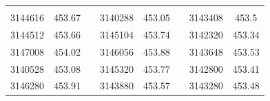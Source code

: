 \documentclass[12pt]{mwart}
\begin{document}

	\begin{table}[H]
	\centering
	\begin{tabular}{cclcclcc}
		\cellcolor[HTML]{4472C4}{\color[HTML]{FFFFFF} $t_c$ [$\mathrm{\mu s}$]} & \cellcolor[HTML]{4472C4}{\color[HTML]{FFFFFF} $C$ [$\mathrm{\mu F}$]} &  & \cellcolor[HTML]{4472C4}{\color[HTML]{FFFFFF} $t_c$ [$\mathrm{\mu s}$]} & \cellcolor[HTML]{4472C4}{\color[HTML]{FFFFFF} $C$ [$\mathrm{\mu F}$]} &  & \cellcolor[HTML]{4472C4}{\color[HTML]{FFFFFF} $t_c$ [$\mathrm{\mu s}$]} & \cellcolor[HTML]{4472C4}{\color[HTML]{FFFFFF} $C$ [$\mathrm{\mu F}$]} \\
		3144616                                                  & 453.67                                                        &  & 3140288                                                  & 453.05                                                        &  & 3143408                                                  & 453.5                                                         \\
		3144512                                                  & 453.66                                                        &  & 3145104                                                  & 453.74                                                        &  & 3142320                                                  & 453.34                                                        \\
		3147008                                                  & 454.02                                                        &  & 3146056                                                  & 453.88                                                        &  & 3143648                                                  & 453.53                                                        \\
		3140528                                                  & 453.08                                                        &  & 3145320                                                  & 453.77                                                        &  & 3142800                                                  & 453.41                                                        \\
		3146280                                                  & 453.91                                                        &  & 3143880                                                  & 453.57                                                        &  & 3143280                                                  & 453.48                                                        \\

\end{tabular}
\end{table}
\end{document}

